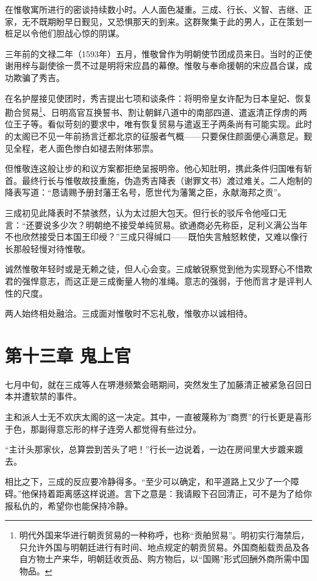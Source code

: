\documentclass[
]{book}
\begin{document}
在惟敬寓所进行的密谈持续数小时。人人面色凝重。三成、行长、义智、吉继、正家，无不既期盼早日觐见，又恐惧那天的到来。这群聚集于此的男人，正在策划一桩足以令他们胆战心惊的阴谋。

三年前的文禄二年（1593年）五月，惟敬曾作为明朝使节团成员来日。当时的正使谢用梓与副使徐一贯不过是明将宋应昌的幕僚。惟敬与奉命援朝的宋应昌合谋，成功欺骗了秀吉。

在名护屋接见使团时，秀吉提出七项和谈条件：将明帝皇女许配为日本皇妃、恢复勘合贸易\footnote{明代外国来华进行朝贡贸易的一种称呼，也称``贡舶贸易''。明初实行海禁后，只允许外国与明朝廷进行有时间、地点规定的朝贡贸易。外国商船载贡品及各自方物土产来华，明朝廷收贡品、购方物后，以``国赐''形式回酬外商所需中国物品。}、日明高官互换誓书、割让朝鲜八道中的南部四道、遣返清正俘虏的两位王子等。看似苛刻的要求中，唯有恢复贸易与遣返王子两条尚有可能实现。此时的太阁已不见一年前扬言迁都北京的征服者气概------只要保住颜面便心满意足。觐见全程，老人面色惨白如褪去附体邪祟。

但惟敬连这般让步的和议方案都拒绝呈报明帝。他心知肚明，携此条件归国唯有斩首。最终行长与惟敬故技重施，伪造秀吉降表（谢罪文书）渡过难关。二人炮制的降表写道：``恳请赐予册封藩王名号，愿世代为藩篱之臣，永献海邦之贡''。

三成初见此降表时不禁骇然，认为太过胆大包天。但行长的驳斥令他哑口无言：``还要说多少次？明朝绝不接受单纯贸易。欲通商必先称臣，足利义满公当年不也欣然接受日本国王印绶？''三成只得缄口------既怕失言触怒敕使，又难以像行长那般轻慢对待惟敬。

诚然惟敬年轻时或是无赖之徒，但人心会变。三成敏锐察觉到他为实现野心不惜欺君的强悍意志，而这正是三成衡量人物的准绳。意志的强弱，于他而言才是评判人性的尺度。

两人始终相处融洽。三成面对惟敬时不忘礼敬，惟敬亦以诚相待。

\chapter*{第十三章 鬼上官}\label{ux7b2cux5341ux4e09ux7ae0-ux9b3cux4e0aux5b98}

七月中旬，就在三成等人在堺港频繁会晤期间，突然发生了加藤清正被紧急召回日本并遭软禁的事件。

主和派人士无不欢庆太阁的这一决定。其中，一直被蔑称为''商贾''的行长更是喜形于色，那副得意忘形的样子连旁人都觉得有些过分。

``主计头那家伙，总算尝到苦头了吧！''行长一边说着，一边在房间里大步踱来踱去。

相比之下，三成的反应要冷静得多。``至少可以确定，和平道路上又少了一个障碍。''他保持着距离感这样说道。言下之意是：我请殿下召回清正，可不是为了给你报私仇的，希望你也能保持冷静。
\end{document}
